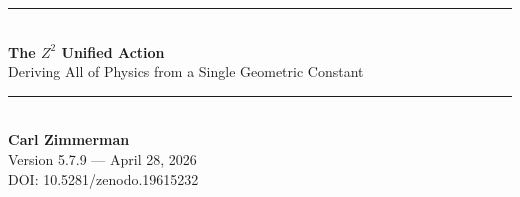 \documentclass[11pt,a4paper]{article}
\theoremstyle{plain}
\theoremstyle{definition}
\theoremstyle{remark}
\begin{document}

\begin{center}
\rule{\textwidth}{1.5pt}\\[0.5cm]
{\LARGE\bfseries The $Z^2$ Unified Action}\\[0.3cm]
{\Large Deriving All of Physics from a Single Geometric Constant}\\[0.5cm]
\rule{\textwidth}{1.5pt}\\[0.8cm]

{\large\bfseries Carl Zimmerman}\\[0.3cm]
Version 5.7.9 --- April 28, 2026\\[0.3cm]
DOI: 10.5281/zenodo.19615232
\end{center}

\vspace{1cm}

\end{document}
